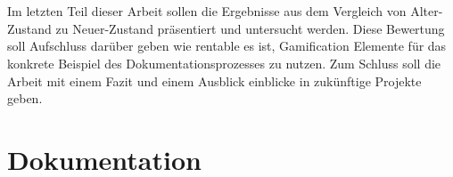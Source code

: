 \documentclass[a4paper,12pt]{scrartcl}
\begin{document}
\\\\
Im letzten Teil dieser Arbeit sollen die Ergebnisse aus dem Vergleich von Alter-Zustand zu Neuer-Zustand präsentiert und untersucht werden. Diese Bewertung soll Aufschluss darüber geben wie rentable es ist, Gamification Elemente für das konkrete Beispiel des Dokumentationsprozesses zu nutzen. Zum Schluss soll die Arbeit mit einem Fazit und einem Ausblick einblicke in zukünftige Projekte geben.
\section{Dokumentation}

\newpage
\listoftables
\listoffigures
\newpage

\end{document}
